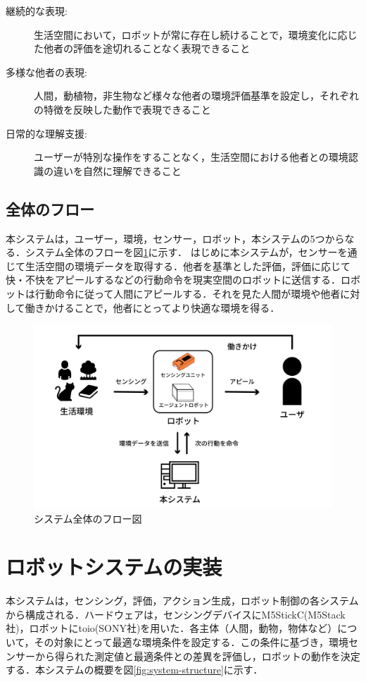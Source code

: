 \documentclass[paper=a4paper,jafontsize=9pt,head_space=15mm,gutter=20mm,
twocolumn,number_of_lines=49, line_length=26zw]{myuarticle}
\begin{document}
\begin{description}
  \item[継続的な表現:] 生活空間において，ロボットが常に存在し続けることで，環境変化に応じた他者の評価を途切れることなく表現できること
  \item[多様な他者の表現:] 人間，動植物，非生物など様々な他者の環境評価基準を設定し，それぞれの特徴を反映した動作で表現できること
  \item[日常的な理解支援:] ユーザーが特別な操作をすることなく，生活空間における他者との環境認識の違いを自然に理解できること
\end{description}

\subsection{全体のフロー}
本システムは，ユーザー，環境，センサー，ロボット，本システムの5つからなる．システム全体のフローを図\ref{fig:system-flow}に示す．
はじめに本システムが，センサーを通じて生活空間の環境データを取得する．他者を基準とした評価，評価に応じて快・不快をアピールするなどの行動命令を現実空間のロボットに送信する．ロボットは行動命令に従って人間にアピールする．それを見た人間が環境や他者に対して働きかけることで，他者にとってより快適な環境を得る．

\begin{figure}[h]
  \centering
  \includegraphics[keepaspectratio,width=0.8\columnwidth]{resources/system_flow.png}
  \caption{システム全体のフロー図}
  \label{fig:system-flow}
\end{figure}

\section{ロボットシステムの実装}
本システムは，センシング，評価，アクション生成，ロボット制御の各システムから構成される．ハードウェアは，センシングデバイスにM5StickC(M5Stack社)，ロボットにtoio(SONY社)を用いた．各主体（人間，動物，物体など）について，その対象にとって最適な環境条件を設定する．この条件に基づき，環境センサーから得られた測定値と最適条件との差異を評価し，ロボットの動作を決定する．本システムの概要を図\ref{fig:system-structure}に示す．
\end{document}
